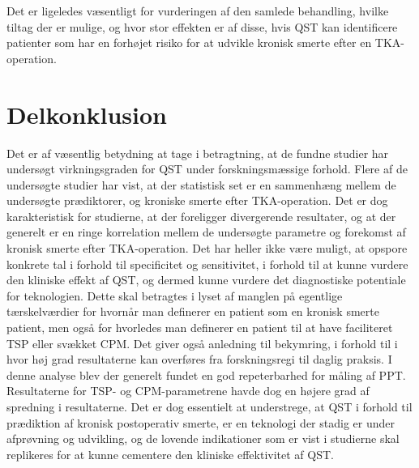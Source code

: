 Det er ligeledes væsentligt for vurderingen af den samlede behandling, hvilke tiltag der er mulige, og hvor stor effekten er af disse, hvis QST kan identificere patienter som har en forhøjet risiko for at udvikle kronisk smerte efter en TKA-operation.

\section{Delkonklusion}
Det er af væsentlig betydning at tage i betragtning, at de fundne studier har undersøgt virkningsgraden for QST under forskningsmæssige forhold. Flere af de undersøgte studier har vist, at der statistisk set er en sammenhæng mellem de undersøgte prædiktorer, og kroniske smerte efter TKA-operation. Det er dog karakteristisk for studierne, at der foreligger divergerende resultater, og at der generelt er en ringe korrelation mellem de undersøgte parametre og forekomst af kronisk smerte efter TKA-operation. Det har heller ikke være muligt, at opspore konkrete tal i forhold til specificitet og sensitivitet, i forhold til at kunne vurdere den kliniske effekt af QST, og dermed kunne vurdere det diagnostiske potentiale for teknologien. Dette skal betragtes i lyset af manglen på egentlige tærskelværdier for hvornår man definerer en patient som en kronisk smerte patient, men også for hvorledes man definerer en patient til at have faciliteret TSP eller svækket CPM. Det giver også anledning til bekymring, i forhold til i hvor høj grad resultaterne kan overføres fra forskningsregi til daglig praksis.
I denne analyse blev der generelt fundet en god repeterbarhed for måling af PPT. Resultaterne for TSP- og CPM-parametrene havde dog en højere grad af spredning i resultaterne.
Det er dog essentielt at understrege, at QST i forhold til prædiktion af kronisk postoperativ smerte, er en teknologi der stadig er under afprøvning og udvikling, og de lovende indikationer som er vist i studierne skal replikeres for at kunne cementere den kliniske effektivitet af QST.


















